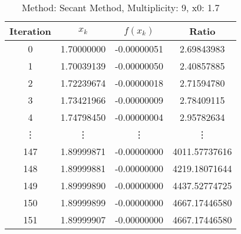\begin{table}
\centering
\caption{Method: Secant Method, Multiplicity: 9, x0: 1.7}
\label{tab:table_Secant_Method_9_1_7}
\begin{tabular}{c c c c}
\toprule
Iteration &      $x_k$ &    $f(x_k)$ &         Ratio \\
\midrule
        0 & 1.70000000 & -0.00000051 &    2.69843983 \\
        1 & 1.70039139 & -0.00000050 &    2.40857885 \\
        2 & 1.72239674 & -0.00000018 &    2.71594780 \\
        3 & 1.73421966 & -0.00000009 &    2.78409115 \\
        4 & 1.74798450 & -0.00000004 &    2.95782634 \\
   \vdots &     \vdots &      \vdots &        \vdots \\
      147 & 1.89999871 & -0.00000000 & 4011.57737616 \\
      148 & 1.89999881 & -0.00000000 & 4219.18071644 \\
      149 & 1.89999890 & -0.00000000 & 4437.52774725 \\
      150 & 1.89999899 & -0.00000000 & 4667.17446580 \\
      151 & 1.89999907 & -0.00000000 & 4667.17446580 \\
\bottomrule
\end{tabular}
\end{table}
